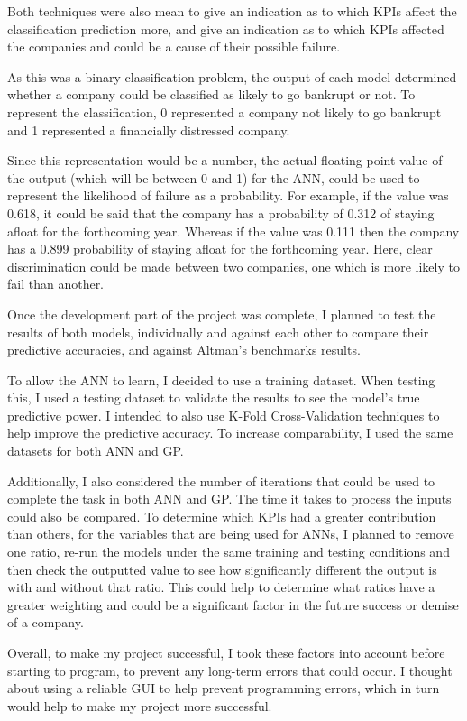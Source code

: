 \documentclass[11pt]{article}
\begin{document}
Both techniques were also mean to give an indication as to which KPIs affect the classification prediction more, and give an indication as to which KPIs affected the companies and could be a cause of their possible failure.  

As this was a binary classification problem, the output of each model determined whether a company could be classified as likely to go bankrupt or not. To represent the classification,  0 represented a company not likely to go bankrupt  and 1 represented a financially distressed company.

Since this representation would be a number, the actual floating point value of the output (which will be between 0 and 1) for the ANN, could be used to represent the likelihood of failure as a probability. For example, if the value was 0.618, it could be said that the company has a probability of 0.312 of staying afloat for the forthcoming year. Whereas if the value was 0.111 then the company has a 0.899 probability of staying afloat for the forthcoming year. Here, clear discrimination could be made between two companies, one which is more likely to fail than another.

Once the development part of the project was complete, I planned to test the results of both models, individually and against each other to compare their predictive accuracies, and against Altman's benchmarks results.

To allow the ANN to learn, I decided to use a training dataset. When testing this, I used a testing dataset to validate the results to see the model's true predictive power. I intended to also use K-Fold Cross-Validation techniques to help improve the predictive accuracy. To increase comparability, I used the same datasets for both ANN and GP.

Additionally, I also considered the number of iterations that could be used to complete the task in both ANN and GP. The time it takes to process the inputs could also be compared. To determine which KPIs had a greater contribution than others, for the variables that are being used for ANNs, I planned to remove one ratio, re-run the models under the same training and testing conditions and then check the outputted value to see how significantly different the output is with and without that ratio. This could help to determine what ratios have a greater weighting and could be a significant factor in the future success or demise of a company. 

Overall, to make my project successful, I took these factors into account before starting to program, to prevent any long-term errors that could occur. I thought about using a reliable GUI to help prevent programming errors, which in turn would help to make my project more successful. 
\end{document}
